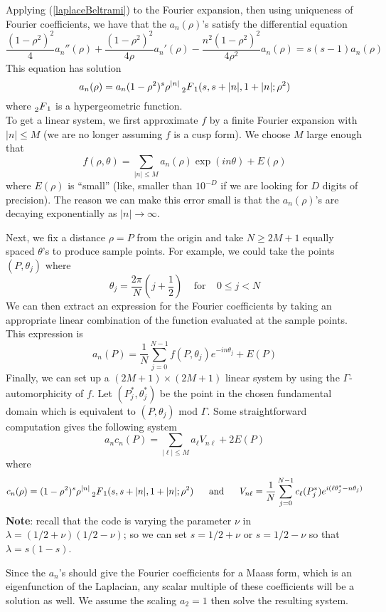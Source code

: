 \documentclass[]{article}
\begin{document}
Applying (\ref{laplaceBeltrami}) to the Fourier expansion, then using uniqueness of Fourier coefficients, we have that the $a_n(\rho)$'s satisfy the differential equation
$$
\frac{(1-\rho^2)^2}{4}a_n''(\rho) + \frac{(1-\rho^2)^2}{4\rho}a_n'(\rho) - \frac{n^2(1-\rho^2)^2}{4\rho^2}a_n(\rho) = s(s-1)a_n(\rho)
$$
This equation has solution
\begin{equation}\label{solnDE}
a_n(\rho) = a_n(1 - \rho^2)^s\rho^{|n|} \prescript{}{2}{F}_1(s, s+|n|, 1+|n|; \rho^2)
\end{equation}
where $\prescript{}{2}{F}_1$ is a hypergeometric function.
\\

To get a linear system, we first approximate $f$ by a finite Fourier expansion with $|n| \leq M$ (we are no longer assuming $f$ is a cusp form).
We choose $M$ large enough that
$$
f(\rho, \theta) = \sum_{|n| \leq M} a_n(\rho)\exp(in\theta) + E(\rho)
$$
where $E(\rho)$ is ``small'' (like, smaller than $10^{-D}$ if we are looking for $D$ digits of precision).
The reason we can make this error small is that the $a_n(\rho)$'s are decaying exponentially as $|n| \rightarrow \infty$.

Next, we fix a distance $\rho = P$ from the origin and take $N \geq 2M+1$ equally spaced $\theta$'s to produce sample points.
For example, we could take the points $(P, \theta_j)$ where
$$
\theta_j = \frac{2\pi}{N}\left( j + \frac{1}{2} \right) ~~~~~\text{for}~~~~~0 \leq j < N
$$
We can then extract an expression for the Fourier coefficients by taking an appropriate linear combination of the function evaluated at the sample points.
This expression is
$$
a_n(P) = \frac{1}{N}\sum_{j=0}^{N-1}f(P, \theta_j)e^{-in\theta_j} + E(P)
$$
Finally, we can set up a $(2M+1)\times (2M+1)$ linear system by using the $\Gamma$-automorphicity of $f$.
Let $(P_j^*, \theta_j^*)$ be the point in the chosen fundamental domain which is equivalent to $(P, \theta_j)$ mod $\Gamma$.
Some straightforward computation gives the following system
$$
a_nc_n(P) = \sum_{|\ell| \leq M} a_\ell V_{n\ell} + 2E(P)
$$
where
$$
c_n(\rho) = (1-\rho^2)^s\rho^{|n|} \prescript{}{2}{F}_1(s, s+|n|, 1+|n|; \rho^2)
~~~~~\text{and}~~~~~
V_{n\ell} = \frac{1}{N}\sum_{j=0}^{N-1}c_\ell(P_j^*)e^{i(\ell\theta_j^* - n\theta_j)}
$$
\textbf{Note}: recall that the code is varying the parameter $\nu$ in $\lambda = (1/2 + \nu)(1/2 - \nu)$; so we can set $s = 1/2 + \nu$ or $s = 1/2 - \nu$ so that $\lambda = s(1-s)$.

Since the $a_n$'s should give the Fourier coefficients for a Maass form, which is an eigenfunction of the Laplacian, any scalar multiple of these coefficients will be a solution as well.
We assume the scaling $a_2 = 1$ then solve the resulting system.
\\
\end{document}
